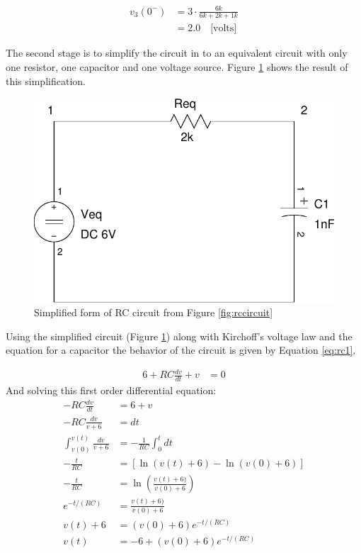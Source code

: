 \documentclass{article}
\begin{document}
\begin{align*}
	v_3(0^-) &= 3 \cdot \frac{6k}{6k + 2k + 1k} \\
			&= 2.0 \quad \mbox{[volts]}
\end{align*}

The second stage is to simplify the circuit in to an equivalent
circuit with only one resistor, one capacitor and one voltage source.
Figure \ref{fig:rccircuiteq} shows the result of this simplification.

\begin{figure}[!hbtp]
\center
\includegraphics[scale=0.5]{spice/rc_circuit-02}
\caption{Simplified form of RC circuit from Figure \ref{fig:rccircuit}}
\label{fig:rccircuiteq}
\end{figure}

Using the simplified circuit (Figure \ref{fig:rccircuiteq})
along with Kirchoff's voltage law and the equation for a capacitor
the behavior of the circuit is given by Equation \ref{eq:rc1}.

\begin{align}
	6 + R C \frac{dv}{dt} + v &= 0  \label{eq:rc1}
\end{align}
And solving this first order differential equation:
\begin{align*}
	-R C \frac{dv}{dt} &= 6 + v \\
	-R C \frac{dv}{v + 6} &= dt \\
	\int_{v(0)}^{v(t)} \frac{dv}{v + 6} &= -\frac{1}{RC} \int_0^t dt \\
	-\frac{t}{RC} &= \left[ \ln (v(t) + 6) - \ln(v(0) + 6) \right] \\
	-\frac{t}{RC} &= \ln \left( \frac{v(t) + 6)}{v(0) + 6} \right) \\
	e^{-t/(RC)} &= \frac{v(t) + 6)}{v(0) + 6} \\
	v(t) + 6 &= (v(0) + 6) e^{-t/(RC)} \\
	v(t) &= -6 + (v(0) + 6) e^{-t/(RC)}
\end{align*}
\end{document}
